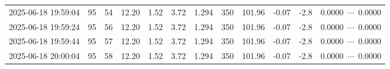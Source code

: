 \documentclass[UTF8,10pt,a4paper,fontset=fandol]{ctexart}
\begin{document}
\begin{center}
\begin{tabular}{|p{1.55cm}|c|c|c|c|c|c|c|c|c|c|p{3.0cm}|}
2025-06-18 19:59:04 & 95 & 54 & 12.20 & 1.52 & 3.72 & 1.294 & 350 & 101.96 & -0.07 & -2.8 & 0.0000\ $\cdots$\ 0.0000 \\
2025-06-18 19:59:24 & 95 & 56 & 12.20 & 1.52 & 3.72 & 1.294 & 350 & 101.96 & -0.07 & -2.8 & 0.0000\ $\cdots$\ 0.0000 \\
2025-06-18 19:59:44 & 95 & 57 & 12.20 & 1.52 & 3.72 & 1.294 & 350 & 101.96 & -0.07 & -2.8 & 0.0000\ $\cdots$\ 0.0000 \\
2025-06-18 20:00:04 & 95 & 58 & 12.20 & 1.52 & 3.72 & 1.294 & 350 & 101.96 & -0.07 & -2.8 & 0.0000\ $\cdots$\ 0.0000 \\
\hline
\end{tabular}
\end{center}


\newpage
\end{document}
